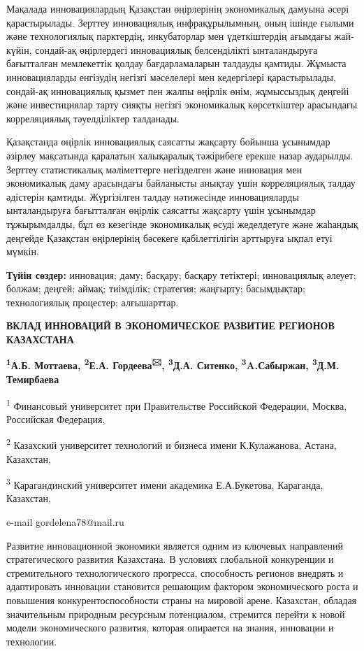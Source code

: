 Мақалада инновациялардың Қазақстан өңірлерінің экономикалық дамуына
әсері қарастырылады. Зерттеу инновациялық инфрақұрылымның, оның ішінде
ғылыми және технологиялық парктердің, инкубаторлар мен үдеткіштердің
ағымдағы жай-күйін, сондай-ақ өңірлердегі инновациялық белсенділікті
ынталандыруға бағытталған мемлекеттік қолдау бағдарламаларын талдауды
қамтиды. Жұмыста инновацияларды енгізудің негізгі мәселелері мен
кедергілері қарастырылады, сондай-ақ инновациялық қызмет пен жалпы
өңірлік өнім, жұмыссыздық деңгейі және инвестициялар тарту сияқты
негізгі экономикалық көрсеткіштер арасындағы корреляциялық тәуелділіктер
талданады.

Қазақстанда өңірлік инновациялық саясатты жақсарту бойынша ұсынымдар
әзірлеу мақсатында қаралатын халықаралық тәжірибеге ерекше назар
аударылды. Зерттеу статистикалық мәліметтерге негізделген және инновация
мен экономикалық даму арасындағы байланысты анықтау үшін корреляциялық
талдау әдістерін қамтиды. Жүргізілген талдау нәтижесінде инновацияларды
ынталандыруға бағытталған өңірлік саясатты жақсарту үшін ұсынымдар
тұжырымдалды, бұл өз кезегінде экономикалық өсуді жеделдетуге және
жаһандық деңгейде Қазақстан өңірлерінің бәсекеге қабілеттілігін
арттыруға ықпал етуі мүмкін.

{\bfseries Түйін сөздер:} инновация; даму; басқару; басқару тетіктері;
инновациялық әлеует; болжам; деңгей; аймақ; тиімділік; стратегия;
жаңғырту; басымдықтар; технологиялық процестер; алғышарттар.

{\bfseries ВКЛАД ИННОВАЦИЙ В ЭКОНОМИЧЕСКОЕ РАЗВИТИЕ РЕГИОНОВ КАЗАХСТАНА}

{\bfseries \textsuperscript{1}А.Б. Моттаева, \textsuperscript{2}Е.А.
Гордеева\textsuperscript{🖂}, \textsuperscript{3}Д.А. Ситенко,
\textsuperscript{3}A.Сабыржан, \textsuperscript{3}Д.М.}
{\bfseries Темирбаева}

\textsuperscript{1} Финансовый университет при Правительстве Российской
Федерации, Москва, Российская Федерация,

\textsuperscript{2} Казахский университет технологий и бизнеса имени
К.Кулажанова, Астана, Казахстан,

\textsuperscript{3} Карагандинский университет имени академика
Е.А.Букетова, Караганда, Казахстан,

e-mail gordelena78@mail.ru

Развитие инновационной экономики является одним из ключевых направлений
стратегического развития Казахстана. В условиях глобальной конкуренции и
стремительного технологического прогресса, способность регионов внедрять
и адаптировать инновации становится решающим фактором экономического
роста и повышения конкурентоспособности страны на мировой арене.
Казахстан, обладая значительным природным ресурсным потенциалом,
стремится перейти к новой модели экономического развития, которая
опирается на знания, инновации и технологии.


